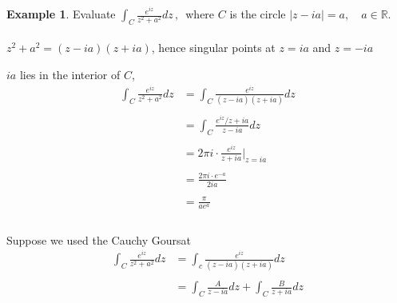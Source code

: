 \documentclass[11pt,a4paper]{article}
\theoremstyle{definition}
\newtheorem{example}[thm]{Example}
\begin{document}
\begin{example}
Evaluate $\displaystyle{\int_C \frac{e^{iz}}{z^2 + a^2}dz\,, \,}$ where $C$ is the circle $\left|z - ia\right| = a, \quad  a\in \mathbb{R}$.\\


\text{\textcolor{red}{Solution}}\\
$z^2 + a^2 = (z - ia) (z + ia)$, hence singular points at $z = ia$ and $z = -ia$


\begin{figure}[H]
\centering
{}
\end{figure}















$ia$ lies in the interior of $C$,
\begin{align*}
\int_C \frac{e^{iz}}{z^2 + a^2}dz & = \int_C \frac{e^{iz}}{(z - ia)(z + ia)}dz\\\\
& = \int_C \frac{e^{iz}/z + ia}{z - ia} dz\\\\
& = 2\pi i \cdot \frac{e^{iz}}{z + ia}\Bigg|_{z = ia}\\\\
& = \frac{2\pi i \cdot e^{-a}}{2ia}\\\\
& = \frac{\pi}{ae^a}\\\\
\end{align*} 


Suppose we used the Cauchy Goursat 
\begin{align*}
\int_C \frac{e^{iz}}{z^2 + a^2}dz & = \int_c \frac{e^{iz}}{(z - ia) (z + ia)}dz\\\\
& = \int_C \frac{A}{z - ia}dz + \int_C \frac{B}{z + ia}dz\\ 
\end{align*}



\end{example}
\end{document}
